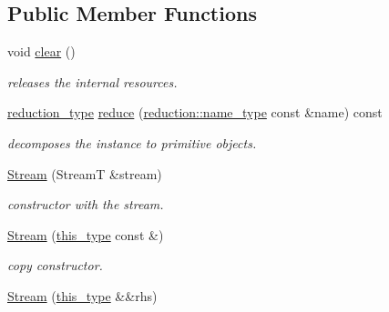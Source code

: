 \subsection*{Public Member Functions}
\begin{DoxyCompactItemize}
\item 
\hypertarget{classhryky_1_1reduction_1_1_stream_a48136f4eabcf48e03b9dfe2cba793883}{void \hyperlink{classhryky_1_1reduction_1_1_stream_a48136f4eabcf48e03b9dfe2cba793883}{clear} ()}\label{classhryky_1_1reduction_1_1_stream_a48136f4eabcf48e03b9dfe2cba793883}

\begin{DoxyCompactList}\small\item\em releases the internal resources. \end{DoxyCompactList}\item 
\hypertarget{classhryky_1_1reduction_1_1_stream_aa60cb1c7a7dc1fb1bc3ab6e57cfa8e34}{\hyperlink{namespacehryky_a343a9a4c36a586be5c2693156200eadc}{reduction\-\_\-type} \hyperlink{classhryky_1_1reduction_1_1_stream_aa60cb1c7a7dc1fb1bc3ab6e57cfa8e34}{reduce} (\hyperlink{namespacehryky_1_1reduction_ac686c30a4c8d196bbd0f05629a6b921f}{reduction\-::name\-\_\-type} const \&name) const }\label{classhryky_1_1reduction_1_1_stream_aa60cb1c7a7dc1fb1bc3ab6e57cfa8e34}

\begin{DoxyCompactList}\small\item\em decomposes the instance to primitive objects. \end{DoxyCompactList}\item 
\hyperlink{classhryky_1_1reduction_1_1_stream_aab5b1cf873b56b2d0d978a672cdc4f60}{Stream} (Stream\-T \&stream)
\begin{DoxyCompactList}\small\item\em constructor with the stream. \end{DoxyCompactList}\item 
\hypertarget{classhryky_1_1reduction_1_1_stream_adf137cae6c9a457bf62cdd16b380ae4e}{\hyperlink{classhryky_1_1reduction_1_1_stream_adf137cae6c9a457bf62cdd16b380ae4e}{Stream} (\hyperlink{classhryky_1_1reduction_1_1_dispatcher_a8a3ef8b3aa55fc7139de687a9be4f693}{this\-\_\-type} const \&)}\label{classhryky_1_1reduction_1_1_stream_adf137cae6c9a457bf62cdd16b380ae4e}

\begin{DoxyCompactList}\small\item\em copy constructor. \end{DoxyCompactList}\item 
\hypertarget{classhryky_1_1reduction_1_1_stream_aa7e38fe1e80a40307e1cd5553c6132b3}{\hyperlink{classhryky_1_1reduction_1_1_stream_aa7e38fe1e80a40307e1cd5553c6132b3}{Stream} (\hyperlink{classhryky_1_1reduction_1_1_dispatcher_a8a3ef8b3aa55fc7139de687a9be4f693}{this\-\_\-type} \&\&rhs)}\label{classhryky_1_1reduction_1_1_stream_aa7e38fe1e80a40307e1cd5553c6132b3}


\end{DoxyCompactItemize}
